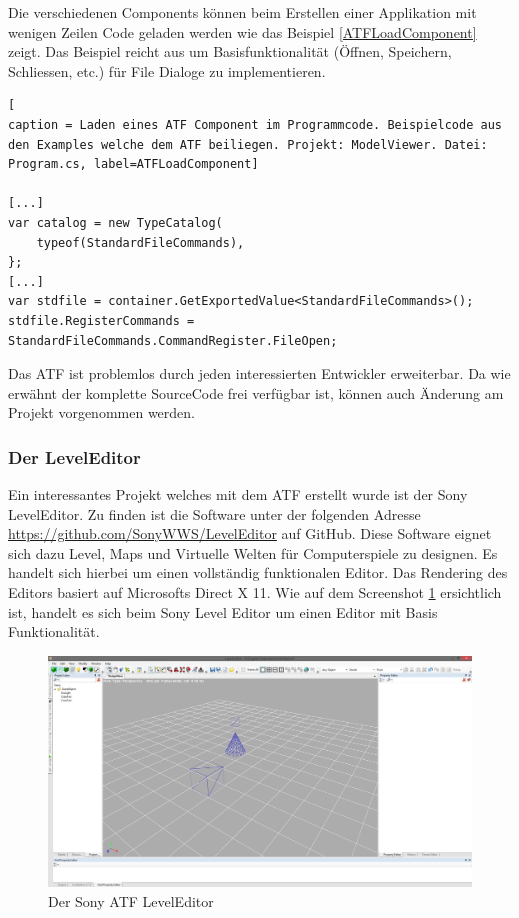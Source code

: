 \documentclass[pagesize, paper=a4, fontsize=12pt, titlepage=true, headings=small, headnosepline, abstractoff, liststotoc, nochapterprefix, plainheadsepline, twoside]{scrreprt}
\begin{document}
Die verschiedenen Components können beim Erstellen einer Applikation mit wenigen Zeilen Code geladen werden wie das Beispiel \ref{ATFLoadComponent} zeigt. Das Beispiel reicht aus um Basisfunktionalität (Öffnen, Speichern, Schliessen, etc.) für File Dialoge zu implementieren.

\begin{lstlisting}[
caption = Laden eines ATF Component im Programmcode. Beispielcode aus den Examples welche dem ATF beiliegen. Projekt: ModelViewer. Datei: Program.cs, label=ATFLoadComponent]

[...]
var catalog = new TypeCatalog(
	typeof(StandardFileCommands),
};
[...]
var stdfile = container.GetExportedValue<StandardFileCommands>();
stdfile.RegisterCommands = StandardFileCommands.CommandRegister.FileOpen;

\end{lstlisting}

Das ATF ist problemlos durch jeden interessierten Entwickler erweiterbar. Da wie erwähnt der komplette SourceCode frei verfügbar ist, können auch Änderung am Projekt vorgenommen werden.

\subsubsection{Der LevelEditor}
Ein interessantes Projekt welches mit dem ATF erstellt wurde ist der Sony LevelEditor. Zu finden ist die Software unter der folgenden Adresse \url{https://github.com/SonyWWS/LevelEditor} auf GitHub. Diese Software eignet sich dazu Level, Maps und Virtuelle Welten für Computerspiele zu designen. Es handelt sich hierbei um einen vollständig funktionalen Editor. Das Rendering des Editors basiert auf Microsofts Direct X 11. Wie auf dem Screenshot \ref{SonyATFLevelEditor} ersichtlich ist, handelt es sich beim Sony Level Editor um einen Editor mit Basis Funktionalität. 

\begin{figure}[ht]
	\centering
	\includegraphics[width=\linewidth]{Bilder/ATFLevelEditor.jpg}
	\caption{Der Sony ATF LevelEditor}
	\label{SonyATFLevelEditor}
\end{figure}
\end{document}
